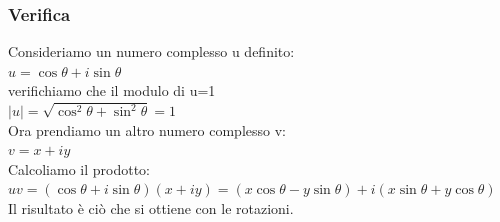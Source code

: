 \documentclass[a4paper]{article}
\begin{document}
\subsubsection{Verifica}
Consideriamo un numero complesso u definito:
\\$u=\cos\theta+\textit{i}\sin\theta
$
\\verifichiamo che il modulo di u=1
\\$ |u|=\sqrt{\cos^2\theta+\sin^2\theta}=1
$
\\Ora prendiamo un altro numero complesso v:
\\ $v=x+\textit{i}y 
$
\\Calcoliamo il prodotto:
\\ $uv=(\cos\theta+\textit{i}\sin\theta)(x+\textit{i}y)=(x\cos\theta-y\sin\theta)+\textit{i}(x\sin\theta+y\cos\theta)
$
\\Il risultato è ciò che si ottiene con le rotazioni.
\end{document}

